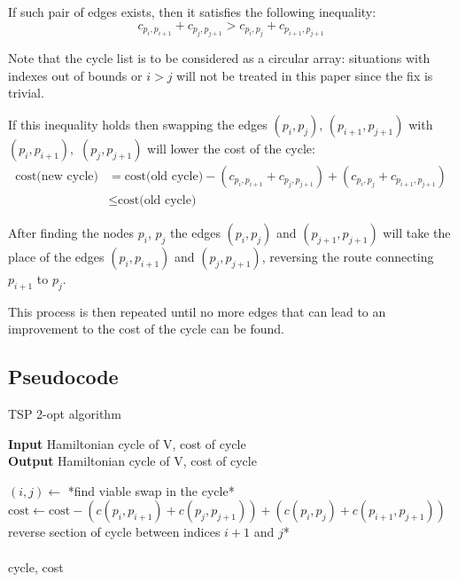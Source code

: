 If such pair of edges exists, then it satisfies the following inequality:
$$c_{p_i,p_{i+1}}+c_{p_j,p_{j+1}} > c_{p_i,p_{j}}+c_{p_{i+1},p_{j+1}}$$

Note that the cycle list is to be considered as a circular array: situations with indexes out of bounds or $i>j$ will not be treated in this paper since the fix is trivial.

If this inequality holds then swapping the edges $(p_i,p_j),\,(p_{i+1},p_{j+1})$ with $(p_i,p_{i+1}),$ $(p_{j},p_{j+1})$ will lower the cost of the cycle:
\begin{align*}
    \mbox{cost(new cycle)}&=\mbox{cost(old cycle)}-(c_{p_i,p_{i+1}}+c_{p_j,p_{j+1}})+(c_{p_i,p_{j}}+c_{p_{i+1},p_{j+1}})\\
    &\leq\mbox{cost(old cycle)}
\end{align*}

After finding the nodes $p_i$, $p_j$ the edges $(p_i, p_j)$ and $(p_{j+1}, p_{j+1})$ will take the place of the edges $(p_i, p_{i+1})$ and $(p_j, p_{j+1})$, reversing the route connecting $p_{i+1}$ to $p_{j}$.

This process is then repeated until no more edges that can lead to an improvement to the cost of the cycle can be found.

\newpage

\subsection{Pseudocode}
\begin{algorithm}
    \caption{TSP 2-opt algorithm}

    \textbf{Input} Hamiltonian cycle of V, cost of cycle\\
    \textbf{Output} Hamiltonian cycle of V, cost of cycle\\
    \begin{algorithmic}

            \State $(i, j)\gets$ *find viable swap in the cycle*
            \State $\mbox{cost}\gets\mbox{cost}-(c(p_i,p_{i+1})+c(p_j,p_{j+1}))+(c(p_i,p_{j})+c(p_{i+1},p_{j+1}))$
            \State *reverse section of cycle between indices $i+1$ and $j$*
        \EndWhile\\\\

        \Return cycle, cost

    \end{algorithmic}
\end{algorithm}

